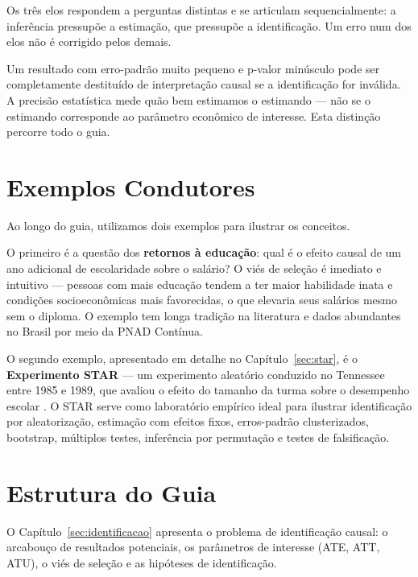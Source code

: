 Os três elos respondem a perguntas distintas e se articulam sequencialmente:
a inferência pressupõe a estimação, que pressupõe a identificação. Um erro
num dos elos não é corrigido pelos demais.

\begin{atencaobox}
Um resultado com erro-padrão muito pequeno e p-valor minúsculo pode ser
completamente destituído de interpretação causal se a identificação for
inválida. A precisão estatística mede quão bem estimamos o estimando ---
não se o estimando corresponde ao parâmetro econômico de interesse.
Esta distinção percorre todo o guia.
\end{atencaobox}


\section{Exemplos Condutores}

Ao longo do guia, utilizamos dois exemplos para ilustrar os conceitos.

O primeiro é a questão dos \textbf{retornos à educação}: qual é o efeito
causal de um ano adicional de escolaridade sobre o salário? O viés de seleção
é imediato e intuitivo --- pessoas com mais educação tendem a ter maior
habilidade inata e condições socioeconômicas mais favorecidas, o que elevaria
seus salários mesmo sem o diploma. O exemplo tem longa tradição na literatura
\citep{Mincer1974, Card1994, Card1995} e dados abundantes no Brasil por meio
da PNAD Contínua.

O segundo exemplo, apresentado em detalhe no Capítulo~\ref{sec:star}, é o
\textbf{Experimento STAR} --- um experimento aleatório conduzido no Tennessee
entre 1985 e 1989, que avaliou o efeito do tamanho da turma sobre o desempenho
escolar \citep{Finn1990, Krueger1999}. O STAR serve como laboratório empírico
ideal para ilustrar identificação por aleatorização, estimação com efeitos
fixos, erros-padrão clusterizados, bootstrap, múltiplos testes, inferência
por permutação e testes de falsificação.


\section{Estrutura do Guia}

O Capítulo~\ref{sec:identificacao} apresenta o problema de identificação
causal: o arcabouço de resultados potenciais, os parâmetros de interesse
(ATE, ATT, ATU), o viés de seleção e as hipóteses de identificação.

